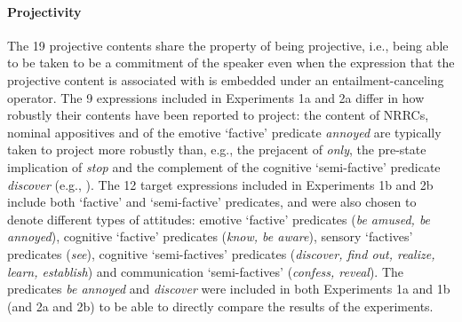 \documentclass[11pt,fleqn]{article}
\newcommand{\6}{\mbox{$[\hspace*{-.6mm}[$}}
\newcommand{\9}{\mbox{$]\hspace*{-.6mm}]$}}
\begin{document}
\paragraph{Projectivity} The 19 projective contents share the property of being projective, i.e., being able to be taken to be a commitment of the speaker even when the expression that the projective content is associated with is embedded under an entailment-canceling operator. The 9 expressions included in Experiments 1a and 2a differ in how robustly their contents have been reported to project: 
the content of NRRCs, nominal appositives and of the emotive `factive' predicate {\em annoyed} are typically taken to project more robustly than, e.g., the prejacent of {\em only}, the pre-state implication of {\em stop} and the complement of the cognitive `semi-factive' predicate {\em discover} (e.g., \citealt{karttunen71b,simons01,potts05,abusch10,beaver-belly}). The 12 target expressions included in Experiments 1b and 2b include both `factive' and `semi-factive' predicates, and were also chosen to denote different types of attitudes: emotive `factive' predicates ({\em be amused, be annoyed}), cognitive `factive' predicates ({\em know, be aware}), sensory `factives' predicates ({\em see}), cognitive `semi-factives' predicates ({\em discover, find out, realize, learn, establish}) and communication `semi-factives' ({\em confess, reveal}). The predicates {\em be annoyed} and {\em discover} were included in both Experiments 1a and 1b (and 2a and 2b) to be able to directly compare the results of the experiments.

\end{document}
